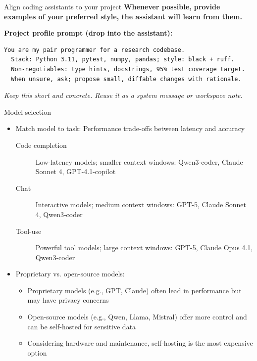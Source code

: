 \documentclass[
  aspectratio=1610,
]{beamer}
\begin{document}
\begin{frame}[fragile]{Align coding assistants to your project}
  \textbf{Whenever possible, provide examples of your preferred style, the assistant will learn from them.}

  \vspace{0.5em}

  \textbf{Project profile prompt (drop into the assistant):}
  \begin{lstlisting}[style=code]
  You are my pair programmer for a research codebase.
  Stack: Python 3.11, pytest, numpy, pandas; style: black + ruff.
  Non-negotiables: type hints, docstrings, 95% test coverage target.
  When unsure, ask; propose small, diffable changes with rationale.
    \end{lstlisting}
  \vspace{0.3em}
  \textit{Keep this short and concrete. Reuse it as a system message or workspace note.}
\end{frame}


\begin{frame}{Model selection}
  \begin{itemize}
    \item Match model to task: Performance trade-offs between latency and accuracy
          \begin{description}
            \item[Code completion] Low-latency models; smaller context windows: Qwen3-coder, Claude Sonnet 4, GPT-4.1-copilot
            \item[Chat] Interactive models; medium context windows: GPT-5, Claude Sonnet 4, Qwen3-coder
            \item[Tool-use] Powerful tool models; large context windows: GPT-5, Claude Opus 4.1, Qwen3-coder
          \end{description}
    \item Proprietary vs. open-source models:
          \begin{itemize}
            \item Proprietary models (e.g., GPT, Claude) often lead in performance but may have privacy concerns
            \item Open-source models (e.g., Qwen, Llama, Mistral) offer more control and can be self-hosted for sensitive data
            \item Considering hardware and maintenance, self-hosting is the most expensive option
          \end{itemize}
  \end{itemize}
\end{frame}
\end{document}
